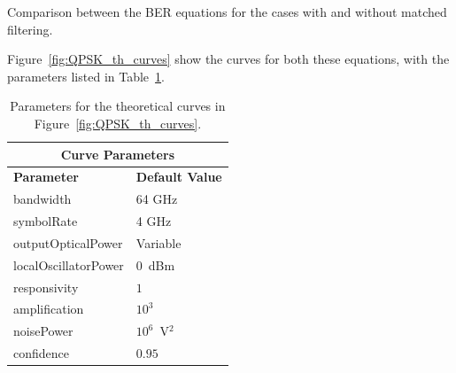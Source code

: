 \begin{refsection}
\begin{table}[H]
	\caption{Comparison between the BER equations for the cases with and without matched filtering.\label{tab:ber_qpsk}}
\end{table}

Figure~\ref{fig:QPSK_th_curves} show the curves for both these equations, with the parameters listed in Table~\ref{tab:thCurves}.

\begin{table}[H]
	\centering
	\begin{tabular}{|l|l|}
		\hline
		\multicolumn{2}{|c|}{ \textbf{Curve Parameters} } \\
		\hline
		\textbf{Parameter}     & \textbf{Default Value}                                     \\\hline
		bandwidth              & 64 GHz															\\\hline
		symbolRate		       & 4 GHz                                                    		\\\hline
		outputOpticalPower     & Variable                                                   \\ \hline
		localOscillatorPower   & $0$~dBm                                                    \\ \hline
		responsivity           & $1$                                                        \\ \hline
		amplification          & $10^3$                                                     \\ \hline
		noisePower			   & $10^6$~V$^2$                             					\\ \hline
		confidence             & $0.95$                                                     \\ \hline
	\end{tabular}
	\caption{Parameters for the theoretical curves in Figure~\ref{fig:QPSK_th_curves}.\label{tab:thCurves}}
\end{table}


\end{refsection}
